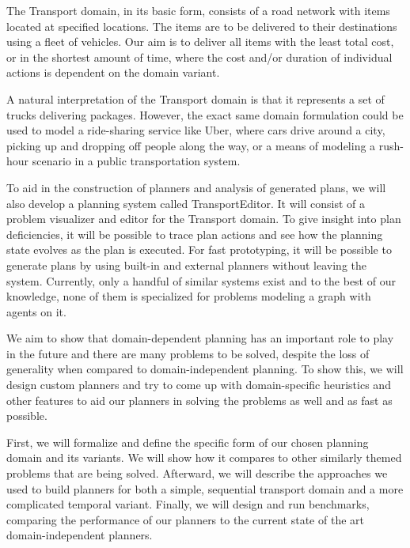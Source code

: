 The Transport domain, in its basic form, consists of a road network with items located at specified locations. The items are to be delivered to their destinations
using a fleet of vehicles. Our aim is to deliver all items
with the least total cost, or in the shortest amount of time,
where the cost and/or duration of individual actions is dependent on the domain variant.

A natural interpretation of the Transport domain is that it represents a set of trucks
delivering packages. However,
the exact same domain formulation could be used to
model a ride-sharing service like Uber, where cars drive around a city, picking up and dropping off people along the way, or
a means of modeling a rush-hour scenario in a public transportation system.

To aid in the construction of planners and analysis of generated
plans, we will also develop a planning system called TransportEditor. It will consist of a problem visualizer and editor for the Transport domain. To give insight into plan deficiencies, it will be possible to trace plan actions and see how the planning
state evolves as the plan is executed. For fast prototyping,
it will be possible to generate plans by using built-in and external planners without leaving the system. Currently, only a handful of similar systems exist and to the best of our knowledge, none of them is specialized for problems modeling a graph with agents on it.

We aim to show that domain-dependent planning has an important
role to play in the future and there are many problems to be solved,
despite the loss of generality when compared to domain-independent planning.
To show this, we will design custom planners
and try to come up with domain-specific heuristics and other features
to aid our planners in solving the problems as well and as fast as
possible.

First, we will formalize and define the specific form of our
chosen planning domain and its variants. We will show how
it compares to other similarly themed problems that are being
solved. Afterward, we will describe the approaches we used
to build planners for both a
simple, sequential transport domain and a more complicated
temporal variant. Finally, we will design and run benchmarks,
comparing the performance of our planners to the current
state of the art domain-independent planners.
